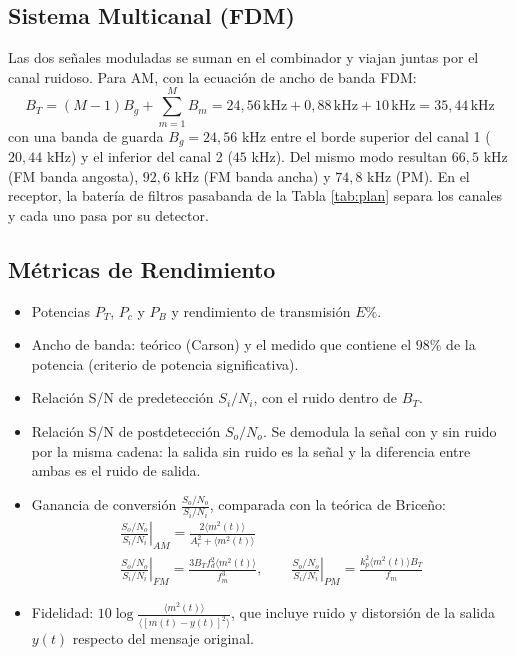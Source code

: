 \documentclass[11pt,a4paper]{article}
\numberwithin{equation}{section}
\begin{document}
\subsection{Sistema Multicanal (FDM)}
Las dos señales moduladas se suman en el combinador y viajan juntas por el canal ruidoso. Para AM, con la ecuación de ancho de banda FDM:
\begin{equation}
  B_T=(M-1)B_g+\sum_{m=1}^{M}B_m=24,56\,\mathrm{kHz}+0,88\,\mathrm{kHz}+10\,\mathrm{kHz}=35,44\,\mathrm{kHz}
\end{equation}
con una banda de guarda $B_g=24,56$ kHz entre el borde superior del canal 1 ($20,44$ kHz) y el inferior del canal 2 ($45$ kHz). Del mismo modo resultan $66,5$ kHz (FM banda angosta), $92,6$ kHz (FM banda ancha) y $74,8$ kHz (PM). En el receptor, la batería de filtros pasabanda de la Tabla \ref{tab:plan} separa los canales y cada uno pasa por su detector.

\subsection{Métricas de Rendimiento}
\begin{itemize}
  \item Potencias $P_T$, $P_c$ y $P_B$ y rendimiento de transmisión $E\%$.
  \item Ancho de banda: teórico (Carson) y el medido que contiene el $98\%$ de la potencia (criterio de potencia significativa).
  \item Relación S/N de predetección $S_i/N_i$, con el ruido dentro de $B_T$.
  \item Relación S/N de postdetección $S_o/N_o$. Se demodula la señal con y sin ruido por la misma cadena: la salida sin ruido es la señal y la diferencia entre ambas es el ruido de salida.
  \item Ganancia de conversión $\frac{S_o/N_o}{S_i/N_i}$, comparada con la teórica de Briceño:
  \begin{gather}
    \left.\frac{S_o/N_o}{S_i/N_i}\right|_{AM}=\frac{2\langle m^2(t)\rangle }{A_r^2+\langle m^2(t)\rangle } \\
    \left.\frac{S_o/N_o}{S_i/N_i}\right|_{FM}=\frac{3B_Tf_d^2\langle m^2(t)\rangle }{f_m^3},\qquad
    \left.\frac{S_o/N_o}{S_i/N_i}\right|_{PM}=\frac{k_p^2\langle m^2(t)\rangle B_T}{f_m}
  \end{gather}
  \item Fidelidad: $10\log\frac{\langle m^2(t)\rangle }{\langle [m(t)-y(t)]^2\rangle }$, que incluye ruido y distorsión de la salida $y(t)$ respecto del mensaje original.
\end{itemize}
\end{document}
